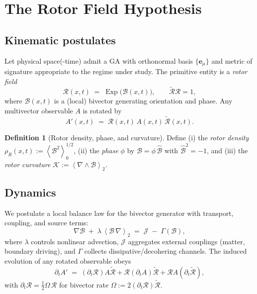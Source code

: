 \documentclass[11pt,a4paper]{article}
\newcommand{\e}{\mathbf{e}}
\newcommand{\grade}[2]{\left\langle #1 \right\rangle_{#2}}
\newcommand{\scal}[1]{\grade{#1}{0}}
\newcommand{\biv}[1]{\grade{#1}{2}}
\newcommand{\rev}[1]{\widetilde{#1}}           %
\newcommand{\Exp}{\operatorname{Exp}}
\newcommand{\Rotor}{\mathcal{R}}
\newcommand{\Biv}{\mathcal{B}}
\newcommand{\D}{\nabla}                        %
\theoremstyle{definition}
\newtheorem{definition}{Definition}
\theoremstyle{plain}
\theoremstyle{remark}
\begin{document}
\vspace{1em}

\section{The Rotor Field Hypothesis}
\subsection{Kinematic postulates}
Let physical space(-time) admit a GA with orthonormal basis $\{\e_\mu\}$ and metric of signature appropriate to the regime under study. The primitive entity is a \emph{rotor field}
\begin{equation}
  \Rotor(x,t) \;=\; \Exp\!\big(\Biv(x,t)\big), 
  \qquad \rev{\Rotor}\Rotor = 1,
  \label{eq:rotor}
\end{equation}
where $\Biv(x,t)$ is a (local) bivector generating orientation and phase. Any multivector observable $A$ is rotated by
\begin{equation}
  A'(x,t) \;=\; \Rotor(x,t)\, A(x,t)\, \rev{\Rotor}(x,t).
\end{equation}

\begin{definition}[Rotor density, phase, and curvature]
Define (i) the \emph{rotor density} $\rho_R(x,t):=\scal{\Biv^2}^{1/2}$, (ii) the \emph{phase} $\phi$ by $\Biv=\phi\,\hat{\Biv}$ with $\hat{\Biv}^2=-1$, and (iii) the \emph{rotor curvature} $\mathcal{K}:=\biv{\D \wedge \Biv}$.
\end{definition}

\subsection{Dynamics}
We postulate a local balance law for the bivector generator with transport, coupling, and source terms:
\begin{equation}
  \D \Biv \;+\; \lambda\, \biv{\Biv\,\D} \;=\; \mathcal{J} \;-\; \Gamma(\Biv),
  \label{eq:rotor-dynamics}
\end{equation}
where $\lambda$ controls nonlinear advection, $\mathcal{J}$ aggregates external couplings (matter, boundary driving), and $\Gamma$ collects dissipative/decohering channels. The induced evolution of any rotated observable obeys
\begin{equation}
  \partial_t A' \;=\; \left(\partial_t \Rotor\right) A \rev{\Rotor} + \Rotor \left(\partial_t A\right)\rev{\Rotor} + \Rotor A \left(\partial_t\rev{\Rotor}\right),
\end{equation}
with $\partial_t \Rotor = \frac{1}{2}\Omega\,\Rotor$ for bivector rate $\Omega:=2(\partial_t \Rotor)\rev{\Rotor}$.
\end{document}
